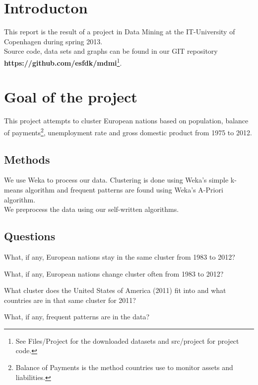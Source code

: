 \section{Introducton}
\label{Intro}
This report is the result of a project in Data Mining at the IT-University of Copenhagen during spring 2013.
\\Source code, data sets and graphs can be found in our GIT repository \textbf{https://github.com/esfdk/mdmi}\footnote{See Files/Project for the downloaded datasets and src/project for project code.}. 

\section{Goal of the project}
This project attempts to cluster European nations based on population, balance of payments\footnote{Balance of Payments is the method countries use to monitor assets and liabilities.}, unemployment rate and gross domestic product from 1975 to 2012.

\subsection{Methods}
We use Weka to process our data. Clustering is done using Weka's simple k-means algorithm and frequent patterns are found using Weka's A-Priori algorithm.
\\We preprocess the data using our self-written algorithms.

\subsection{Questions}
\label{Intro_que}
\begin{my_itemize}
\item What, if any, European nations stay in the same cluster from 1983 to 2012?
\item What, if any, European nations change cluster often from 1983 to 2012?
\item What cluster does the United States of America (2011) fit into and what countries are in that same cluster for 2011?
\item What, if any, frequent patterns are in the data?
\end{my_itemize}

